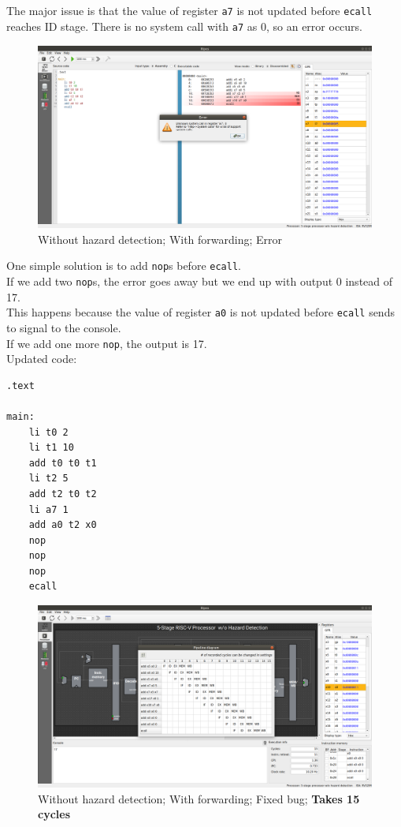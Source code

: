 \documentclass[12pt, fleqn]{article}
\begin{document}
\subsection{}
The major issue is that the value of register \verb!a7! is not updated before \verb!ecall! reaches ID stage. There is no system call with \verb!a7! as 0, so an error occurs. \\
\begin{figure}[H]
  \centering
  \includegraphics[scale=0.22]{Q3/nhf_error_init.png}
  \caption{Without hazard detection; With forwarding; Error}
\end{figure}

One simple solution is to add \verb!nop!s before \verb!ecall!. \\
If we add two \verb!nop!s, the error goes away but we end up with output 0 instead of 17. \\
This happens because the value of register \verb!a0! is not updated before \verb!ecall! sends to signal to the console. \\
If we add one more \verb!nop!, the output is 17. \\

Updated code:
\begin{verbatim}
.text

main:
    li t0 2
    li t1 10
    add t0 t0 t1
    li t2 5
    add t2 t0 t2
    li a7 1
    add a0 t2 x0
    nop
    nop
    nop
    ecall
\end{verbatim}

\begin{figure}[H]
  \centering
  \includegraphics[scale=0.22]{Q3/nhf_console_fixed.png}
  \caption{Without hazard detection; With forwarding; Fixed bug; \textbf{Takes 15 cycles}}
\end{figure}
\end{document}
